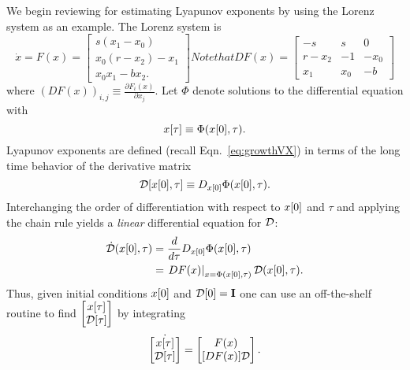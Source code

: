 We begin reviewing \cite{Benettin80} for
estimating Lyapunov exponents by using the Lorenz system as an
example.  The Lorenz system is
\begin{subequations}
  \label{eq:LorenzTangent}
\begin{equation}
  \dot x = F(x) = 
  \begin{bmatrix}
    s(x_1-x_0)\\ x_0(r - x_2) -x_1 \\ x_0 x_1 - bx_2.
  \end{bmatrix}
\end{equation}
Note that
\begin{equation}
  D F(x) = 
  \begin{bmatrix}
    -s & s & 0 \\ r-x_2 & -1 & -x_0 \\ x_1 & x_0 & -b
  \end{bmatrix}
\end{equation}
\end{subequations}
where $\left(D F(x)\right)_{i,j} \equiv \frac{\partial F_i(x)}{\partial
  x_j}$.  Let $\Phi$ denote solutions to the differential equation
with
\newcommand{\DM}{{\cal{D}}} %
\newcommand{\ct}{\tau}      %
\begin{equation*}
  \ti{x}{\ct} \equiv \Phi(\ti{x}{0},\ct).
\end{equation*}
Lyapunov exponents are defined (recall Eqn.~\eqref{eq:growthVX}) in
terms of the long time behavior of the derivative matrix
\begin{equation*}
  \ti{\DM}{\ti{x}{0},\ct} \equiv D_{\ti{x}{0}} \Phi(\ti{x}{0},\ct).
\end{equation*}
Interchanging the order of differentiation with respect to ${x}{[0]}$
and $\ct$ and applying the chain rule yields a \emph{linear}
differential equation for $\DM$:
\begin{align*}
  \dot \DM(\ti{x}{0},\ct) &=  \frac{d}{d\ct} D_{\ti{x}{0}}
  \Phi(\ti{x}{0},\ct)\\
  &= \left. D F(x) \right|_{x=\Phi(\ti{x}{0},\ct)}
  \DM(\ti{x}{0},\ct).
\end{align*}
Thus, given initial conditions ${x}{[0]}$ and $\ti{\DM}{0} = \id $
one can  use an off-the-shelf routine to find $\begin{bmatrix}
  \ti{x}{\ct}\\ \ti{\DM}{\ct}\end{bmatrix}$ by integrating 
\begin{equation}
  \label{eq:TangentODE}
  \dot {\begin{bmatrix} \ti{x}{\ct}\\\ti{\DM}{\ct}\end{bmatrix}} = 
  \begin{bmatrix}
    F(x) \\  [D F(x)] \DM
  \end{bmatrix}.
\end{equation}

